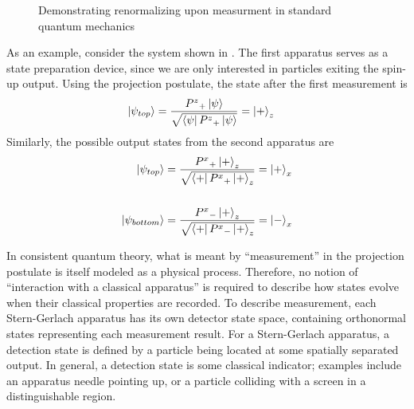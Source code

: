 \begin{figure}
\centering\CaptionFontSize
{}
\caption[Insert an abbreviated caption here to show in the List of Figures]
{Demonstrating renormalizing upon measurment in standard quantum mechanics}
\label{Figure:Measurement:Renormalizing}
\end{figure}

As an example, consider the system shown in . The first apparatus serves as a state preparation device, since we are only interested in particles exiting the spin-up output. Using the projection postulate, the state after the first measurement is
\begin{align*}
    \ket{\psi_{top}} &= \frac{{P^z}_+\ket{\psi}}{\sqrt{\bra{\psi}{P^z}_+\ket{\psi}}} = \ket{+}_z
\end{align*}
Similarly, the possible output states from the second apparatus are
\begin{align*}
    \ket{\psi_{top}} &= \frac{{P^x}_+\ket{+}_z}{\sqrt{\bra{+}{P^x}_+\ket{+}_z}} = \ket{+}_x \\ \\
    \ket{\psi_{bottom}} &= \frac{{P^x}_-\ket{+}_z}{\sqrt{\bra{+}{P^x}_-\ket{+}_z}} = \ket{-}_x
\end{align*}

In consistent quantum theory, what is meant by ``measurement'' in the projection postulate is itself modeled as a physical process. Therefore, no notion of ``interaction with a classical apparatus'' is required to describe how states evolve when their classical properties are recorded. To describe measurement, each Stern-Gerlach apparatus has its own detector state space, containing orthonormal states representing each measurement result. For a Stern-Gerlach apparatus, a detection state is defined by a particle being located at some spatially separated output. In general, a detection state is some classical indicator; examples include an apparatus needle pointing up, or a particle colliding with a screen in a distinguishable region.

